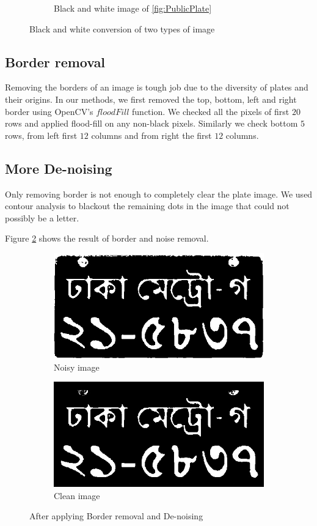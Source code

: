 \documentclass{standalone}
\begin{document}
\begin{figure}
\begin{subfigure}{.5\textwidth}
  \caption{Black and white image of \ref{fig:PublicPlate}}
\end{subfigure}
\caption{Black and white conversion of two types of image}
\label{fig:BlackAndWhite}
\end{figure}

\subsection{Border removal}
Removing the borders of an image is tough job due to the diversity of plates and their origins. In our methods, we first removed the top, bottom, left and right border using OpenCV's $floodFill$ function. We checked all the pixels of first $20$ rows and applied flood-fill on any non-black pixels. Similarly we check bottom $5$ rows, from left first $12$ columns and from right the first $12$ columns.

\subsection{More De-noising}
Only removing border is not enough to completely clear the plate image. We used contour analysis to blackout the remaining dots in the image that could not possibly be a letter. 

Figure \ref{fig:CleaningStage} shows the result of border and noise removal.
\begin{figure}
\begin{subfigure}{.5\textwidth}
  \centering
  \includegraphics[width=.8\linewidth]{./img/sample/stage11.jpg}
  \caption{Noisy image}
\end{subfigure}
\begin{subfigure}{.5\textwidth}
  \centering
  \includegraphics[width=.8\linewidth]{./img/sample/stage12.jpg}
  \caption{Clean image}
\end{subfigure}
\caption{After applying Border removal and De-noising}
\label{fig:CleaningStage}
\end{figure}
\end{document}
